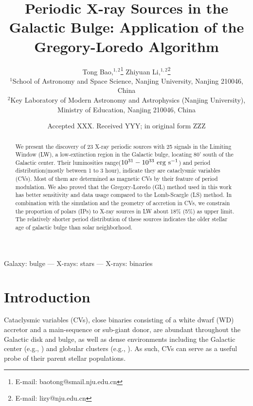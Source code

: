 \documentclass[fleqn,usenatbib]{mnras}
\title[Periodic X-ray Sources in the Galactic Bulge]{Periodic X-ray Sources in the Galactic Bulge: Application of the Gregory-Loredo Algorithm}
\author[Bao \& Li]{
Tong Bao,$^{1,2}$\thanks{E-mail: baotong@smail.nju.edu.cn}
Zhiyuan Li,$^{1,2}$\thanks{E-mail: lizy@nju.edu.cn}
\\
$^{1}$School of Astronomy and Space Science, Nanjing University, Nanjing 210046, China\\
$^{2}$Key Laboratory of Modern Astronomy and Astrophysics (Nanjing University), Ministry of Education, Nanjing 210046, China
}
\date{Accepted XXX. Received YYY; in original form ZZZ}
\begin{document}
\maketitle
\begin{abstract}
We present the discovery of 23 X-ray periodic sources with 25 signals in the Limiting Window (LW), a low-extinction region in the Galactic bulge, locating 80' south of the Galactic center. Their luminosities range(${\rm 10^{31}-10^{33} ~erg ~ s^{-1}}$) and period distribution(mostly between 1 to 3 hour), indicate they are cataclysmic variables (CVs). Most of them are determined as magnetic CVs by their feature of period modulation. 
We also proved that the Gregory-Loredo (GL) method used in this work has better sensitivity and data usage compared to the Lomb-Scargle (LS) method. In combination with the simulation and the geometry of accretion in CVs, we constrain the proportion of polars (IPs) to X-ray sources in LW about 18\% (5\%) as upper limit. 
The relatively shorter period distribution of these sources indicates the older stellar age of galactic bulge than solar neighborhood.
\end{abstract}

\begin{keywords}
Galaxy: bulge --- X-rays: stars --- X-rays: binaries
\end{keywords}

\section{Introduction} \label{sec:intro}
Cataclysmic variables (CVs), close binaries consisting of a white dwarf (WD) accretor and a main-sequence or sub-giant donor,
are abundant throughout the Galactic disk and bulge, as well as dense environments including the Galactic center (e.g., \citealp{2003ApJ...599..465M,2009ApJS..181..110M,2018ApJS..235...26Z}) and globular clusters (e.g., \citealp{2006ApJ...646L.143P,2018ApJ...858...33C}). 
As such, CVs can serve as a useful probe of their parent stellar populations.
\end{document}
